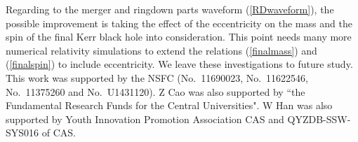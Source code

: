 \documentclass[prd,aps,a4paper,superscriptaddress,twocolumn,footinbib,showpacs]{revtex4}
\begin{document}
Regarding to the merger and ringdown parts waveform (\ref{RDwaveform}), the possible improvement is taking the effect of the eccentricity on the mass and the spin of the final Kerr black hole into consideration. This point needs many more numerical relativity simulations to extend the relations (\ref{finalmass}) and (\ref{finalspin}) to include eccentricity. We leave these investigations to future study.
\acknowledgments
This work was supported by the NSFC (No.~11690023, No.~11622546, No.~11375260 and No.~U1431120). Z Cao was also supported by ``the Fundamental Research Funds for the Central Universities". W Han was also supported by Youth Innovation Promotion Association CAS and QYZDB-SSW-SYS016 of CAS.

\end{document}

